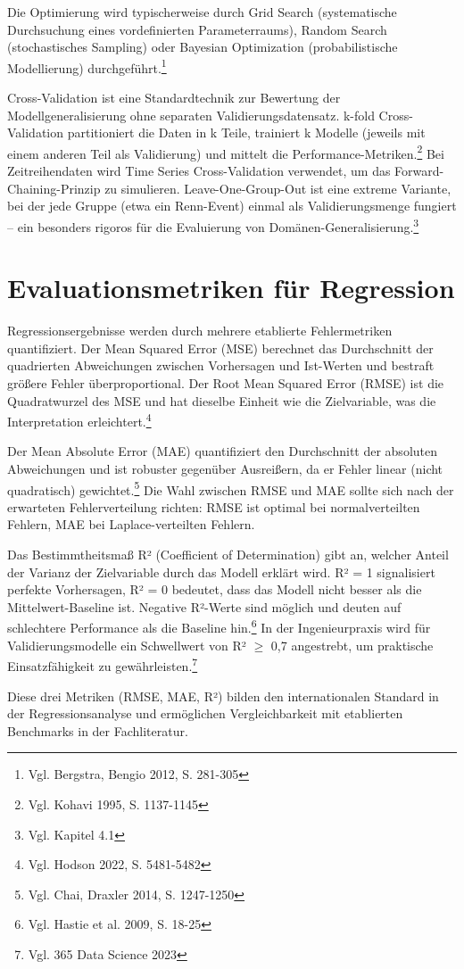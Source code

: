 Die Optimierung wird typischerweise durch Grid Search (systematische Durchsuchung eines vordefinierten Parameterraums), Random Search (stochastisches Sampling) oder Bayesian Optimization (probabilistische Modellierung) durchgeführt.\footnote{Vgl. Bergstra, Bengio 2012, S. 281-305}

Cross-Validation ist eine Standardtechnik zur Bewertung der Modellgeneralisierung ohne separaten Validierungsdatensatz. k-fold Cross-Validation partitioniert die Daten in k Teile, trainiert k Modelle (jeweils mit einem anderen Teil als Validierung) und mittelt die Performance-Metriken.\footnote{Vgl. Kohavi 1995, S. 1137-1145} Bei Zeitreihendaten wird Time Series Cross-Validation verwendet, um das Forward-Chaining-Prinzip zu simulieren. Leave-One-Group-Out ist eine extreme Variante, bei der jede Gruppe (etwa ein Renn-Event) einmal als Validierungsmenge fungiert – ein besonders rigoros für die Evaluierung von Domänen-Generalisierung.\footnote{Vgl. Kapitel 4.1}

\section{Evaluationsmetriken für Regression}

Regressionsergebnisse werden durch mehrere etablierte Fehlermetriken quantifiziert. Der Mean Squared Error (MSE) berechnet das Durchschnitt der quadrierten Abweichungen zwischen Vorhersagen und Ist-Werten und bestraft größere Fehler überproportional. Der Root Mean Squared Error (RMSE) ist die Quadratwurzel des MSE und hat dieselbe Einheit wie die Zielvariable, was die Interpretation erleichtert.\footnote{Vgl. Hodson 2022, S. 5481-5482}

Der Mean Absolute Error (MAE) quantifiziert den Durchschnitt der absoluten Abweichungen und ist robuster gegenüber Ausreißern, da er Fehler linear (nicht quadratisch) gewichtet.\footnote{Vgl. Chai, Draxler 2014, S. 1247-1250} Die Wahl zwischen RMSE und MAE sollte sich nach der erwarteten Fehlerverteilung richten: RMSE ist optimal bei normalverteilten Fehlern, MAE bei Laplace-verteilten Fehlern.

Das Bestimmtheitsmaß R² (Coefficient of Determination) gibt an, welcher Anteil der Varianz der Zielvariable durch das Modell erklärt wird. R² = 1 signalisiert perfekte Vorhersagen, R² = 0 bedeutet, dass das Modell nicht besser als die Mittelwert-Baseline ist. Negative R²-Werte sind möglich und deuten auf schlechtere Performance als die Baseline hin.\footnote{Vgl. Hastie et al. 2009, S. 18-25} In der Ingenieurpraxis wird für Validierungsmodelle ein Schwellwert von R² $\geq$ 0,7 angestrebt, um praktische Einsatzfähigkeit zu gewährleisten.\footnote{Vgl. 365 Data Science 2023}

Diese drei Metriken (RMSE, MAE, R²) bilden den internationalen Standard in der Regressionsanalyse und ermöglichen Vergleichbarkeit mit etablierten Benchmarks in der Fachliteratur.